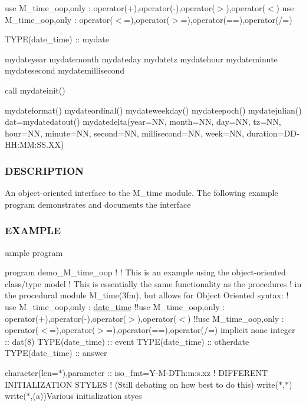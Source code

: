 use M\+\_\+time\+\_\+oop,only \+: operator(+),operator(-\/),operator($>$),operator($<$) use M\+\_\+time\+\_\+oop,only \+: operator($<$=),operator($>$=),operator(==),operator(/=)

T\+Y\+P\+E(date\+\_\+time) \+:\+: mydate

mydateyear mydatemonth mydateday mydatetz mydatehour mydateminute mydatesecond mydatemillisecond

call mydateinit()

mydateformat(\textquotesingle{}\textquotesingle{}) mydateordinal() mydateweekday() mydateepoch() mydatejulian() dat=mydatedatout() mydatedelta(year=NN, month=NN, day=NN, tz=NN, hour=NN, minute=NN, second=NN, millisecond=NN, week=NN, duration=\textquotesingle{}D\+D-\/\+HH\+:MM\+:S\+S.\+XX\textquotesingle{})

\subsubsection*{D\+E\+S\+C\+R\+I\+P\+T\+I\+ON}

An object-\/oriented interface to the M\+\_\+time module. The following example program demonstrates and documents the interface

\subsubsection*{E\+X\+A\+M\+P\+LE}

sample program

program demo\+\_\+\+M\+\_\+time\+\_\+oop ! ! This is an example using the object-\/oriented class/type model ! This is essentially the same functionality as the procedures ! in the procedural module M\+\_\+time(3fm), but allows for Object Oriented syntax\+: ! use M\+\_\+time\+\_\+oop,only \+: \mbox{\hyperlink{structm__time__oop_1_1date__time}{date\+\_\+time}} !!use M\+\_\+time\+\_\+oop,only \+: operator(+),operator(-\/),operator($>$),operator($<$) !!use M\+\_\+time\+\_\+oop,only \+: operator($<$=),operator($>$=),operator(==),operator(/=) implicit none integer \+:\+: dat(8) T\+Y\+P\+E(date\+\_\+time) \+:\+: event T\+Y\+P\+E(date\+\_\+time) \+:\+: otherdate T\+Y\+P\+E(date\+\_\+time) \+:\+: answer

character(len=$\ast$),parameter \+:\+: iso\+\_\+fmt=\textquotesingle{}Y-\/M-\/DTh\+:m\+:s.xz\textquotesingle{} ! D\+I\+F\+F\+E\+R\+E\+NT I\+N\+I\+T\+I\+A\+L\+I\+Z\+A\+T\+I\+ON S\+T\+Y\+L\+ES ! (Still debating on how best to do this) write($\ast$,$\ast$) write($\ast$,\textquotesingle{}(a)\textquotesingle{})\textquotesingle{}Various initialization styes\textquotesingle{}

